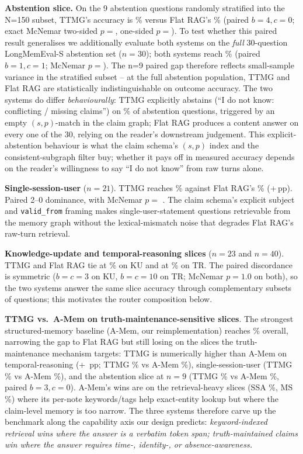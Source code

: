 \textbf{Abstention slice.} On the 9 abstention questions
randomly stratified into the N=150 subset, TTMG's accuracy is
\TTMGLMEAccABS\% versus Flat RAG's \FlatLMEAccABS\%
(paired $b{=}4, c{=}0$; exact McNemar two-sided $p{=}$\McnemarABS,
one-sided $p{=}$\McnemarABSonesided). To test whether this paired
result generalises we additionally evaluate both systems on the
\emph{full} 30-question LongMemEval-S abstention set
($n{=}30$); both systems reach \TTMGABSFull\% (paired $b{=}1, c{=}1$;
McNemar $p{=}$\McnemarABSFull). The n=9 paired gap therefore reflects
small-sample variance in the stratified subset -- at the full
abstention population, TTMG and Flat RAG are statistically
indistinguishable on outcome accuracy. The two systems do differ
\emph{behaviourally}: TTMG explicitly abstains
(``I do not know: conflicting / missing claims'') on
\TTMGABSFullAbstainRate\% of abstention questions, triggered by an
empty $(s,p)$-match in the claim graph; Flat RAG
produces a content answer on every one of the 30, relying on the
reader's downstream judgement. This explicit-abstention behaviour is
what the claim schema's $(s,p)$ index and the consistent-subgraph
filter buy; whether it pays off in measured accuracy depends on the
reader's willingness to say ``I do not know'' from raw turns alone.

\textbf{Single-session-user} ($n{=}21$). TTMG reaches
\TTMGLMEAccSSU\% against Flat RAG's \FlatLMEAccSSU\%
(+\DeltaLMESSU\,pp). Paired 2--0 dominance, with McNemar $p =$
\McnemarSSU. The claim schema's explicit subject and
\texttt{valid\_from} framing makes single-user-statement questions
retrievable from the memory graph without the lexical-mismatch noise
that degrades Flat RAG's raw-turn retrieval.

\textbf{Knowledge-update and temporal-reasoning slices} ($n{=}23$
and $n{=}40$). TTMG and Flat RAG tie at
\TTMGLMEAccKU\% on KU and at \TTMGLMEAccTR\% on TR. The paired
discordance is symmetric ($b{=}c{=}3$ on KU, $b{=}c{=}10$ on TR;
McNemar $p{=}1.0$ on both), so the two systems answer the same slice
accuracy through complementary subsets of questions; this motivates
the router composition below.

\textbf{TTMG vs.\ A-Mem on truth-maintenance-sensitive slices}. The
strongest structured-memory baseline (A-Mem, our reimplementation)
reaches \AmemLMEAcc\% overall, narrowing the gap to Flat RAG but
still losing on the slices the truth-maintenance mechanism targets:
TTMG is numerically higher than A-Mem on temporal-reasoning
(+\DeltaLMETR~pp; TTMG \TTMGLMEAccTR\% vs A-Mem \AmemLMEAccTR\%),
single-session-user (TTMG \TTMGLMEAccSSU\% vs A-Mem
\AmemLMEAccSSU\%), and the abstention slice at $n{=}9$
(TTMG \TTMGLMEAccABS\% vs A-Mem \AmemLMEAccABS\%, paired
$b{=}3, c{=}0$). A-Mem's wins are on the retrieval-heavy slices
(SSA \AmemLMEAccSSA\%, MS \AmemLMEAccMS\%) where its per-note
keywords/tags help exact-entity lookup but where the claim-level
memory is too narrow. The three systems therefore carve up the
benchmark along the capability axis our design predicts:
\emph{keyword-indexed retrieval wins where the answer is a verbatim
token span; truth-maintained claims win where the answer requires
time-, identity-, or absence-awareness.}

